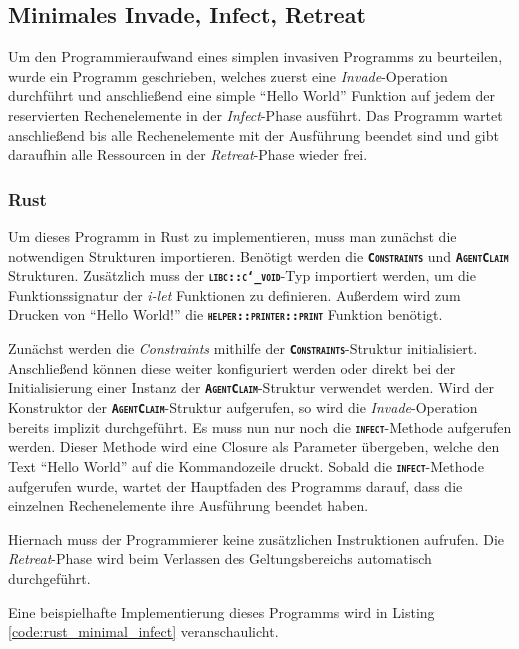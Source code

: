 \subsection{Minimales Invade, Infect, Retreat}

Um den Programmieraufwand eines simplen invasiven Programms zu beurteilen, wurde ein Programm geschrieben, 
welches zuerst eine \textit{Invade}-Operation durchführt und anschließend eine simple "`Hello World"'
Funktion auf jedem der reservierten Rechenelemente in der \textit{Infect}-Phase ausführt.
Das Programm wartet anschließend bis alle Rechenelemente mit der Ausführung beendet sind und gibt daraufhin
alle Ressourcen in der \textit{Retreat}-Phase wieder frei.

\subsubsection{Rust}

Um dieses Programm in Rust zu implementieren, muss man zunächst die notwendigen Strukturen importieren.
Benötigt werden die \texttt{\textsc{\textbf{Constraints}}} und \texttt{\textsc{\textbf{AgentClaim}}} Strukturen. 
Zusätzlich muss der \texttt{\textsc{\textbf{libc::c\char`_void}}}-Typ importiert werden,
um die Funktionssignatur der \textit{i-let} Funktionen zu definieren.
Außerdem wird zum Drucken von "`Hello World!"' die \texttt{\textsc{\textbf{helper::printer::print}}}
Funktion benötigt.

Zunächst werden die \textit{Constraints} mithilfe der \texttt{\textsc{\textbf{Constraints}}}-Struktur initialisiert.
Anschließend können diese weiter konfiguriert werden oder direkt bei der Initialisierung einer Instanz der
\texttt{\textsc{\textbf{AgentClaim}}}-Struktur verwendet werden. Wird der Konstruktor
der \texttt{\textsc{\textbf{AgentClaim}}}-Struktur aufgerufen,
so wird die \textit{Invade}-Operation bereits implizit durchgeführt.
Es muss nun nur noch die \texttt{\textsc{\textbf{infect}}}-Methode aufgerufen werden.
Dieser Methode wird eine Closure als Parameter übergeben, welche den
Text "`Hello World"' auf die Kommandozeile druckt. Sobald die \texttt{\textsc{\textbf{infect}}}-Methode
aufgerufen wurde, wartet der Hauptfaden des Programms darauf,
dass die einzelnen Rechenelemente ihre Ausführung beendet haben.

Hiernach muss der Programmierer keine zusätzlichen Instruktionen aufrufen. Die \textit{Retreat}-Phase wird beim
Verlassen des Geltungsbereichs automatisch durchgeführt.

Eine beispielhafte Implementierung dieses Programms wird in Listing \ref{code:rust_minimal_infect} veranschaulicht.

